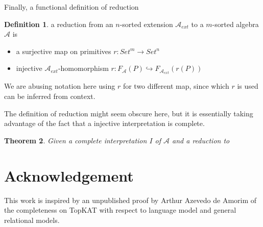 \documentclass{article}
\theoremstyle{plain}
\newtheorem{theorem}{Theorem}[section]
\theoremstyle{definition}
\newtheorem{definition}[theorem]{Definition}
\theoremstyle{remark}
\begin{document}
Finally, a functional definition of reduction 
\begin{definition}
    a reduction from an \(n\)-sorted extension \(𝒜_{ext}\) to 
    a \(m\)-sorted algebra \(𝒜\) is 
    \begin{itemize}
        \item a surjective map on primitives \(r: Set^m → Set^n\) 
        \item injective \(𝒜_{ext}\)-homomorphism \(r: F_{𝒜}(P) ↪ F_{𝒜_{ext}}(r(P))\)
    \end{itemize} 
\end{definition}
We are abusing notation here using \(r\) for two different map, 
since which \(r\) is used can be inferred from context.

The definition of reduction might seem obscure here, 
but it is essentially taking advantage of the fact that a 
injective interpretation is complete.
\begin{theorem}
    Given a complete interpretation \(I\) of \(𝒜\) and a reduction to 
\end{theorem}




\section{Acknowledgement}

This work is inspired by an unpublished proof by Arthur Azevedo de Amorim 
of the completeness on TopKAT with respect to language model 
and general relational models.












\printbibliography
\end{document}
